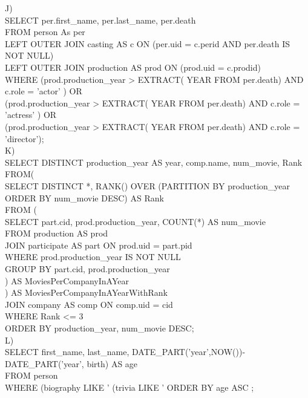 \documentclass{article}
\begin{document}
J)\\
SELECT per.first_name, per.last_name, per.death \\
FROM person As per\\
LEFT OUTER JOIN casting AS c ON (per.uid = c.perid AND per.death IS NOT NULL)\\
LEFT OUTER JOIN production AS prod ON (prod.uid = c.prodid)\\
WHERE (prod.production_year > EXTRACT( YEAR FROM per.death) AND c.role = 'actor' ) OR\\
	(prod.production_year > EXTRACT( YEAR FROM per.death) AND c.role = 'actress' ) OR\\
(prod.production_year > EXTRACT( YEAR FROM per.death) AND c.role = 'director');\\

K)\\
SELECT DISTINCT production_year AS year, comp.name, num_movie, Rank\\
FROM(\\
    SELECT DISTINCT *, RANK() OVER (PARTITION BY production_year ORDER BY num_movie DESC) AS Rank\\
    FROM (\\
        SELECT part.cid, prod.production_year, COUNT(*) AS num_movie\\
        FROM production AS prod\\
        JOIN participate AS part ON prod.uid = part.pid\\
        WHERE prod.production_year IS NOT NULL\\
        GROUP BY part.cid, prod.production_year\\
    ) AS MoviesPerCompanyInAYear\\
) AS MoviesPerCompanyInAYearWithRank\\
JOIN company AS comp ON comp.uid = cid\\
WHERE Rank <= 3\\
ORDER BY production_year, num_movie DESC;\\

L)\\
SELECT first_name, last_name, DATE_PART('year',NOW())-DATE_PART('year', birth) AS age\\
FROM person\\
WHERE (biography LIKE '%
(trivia LIKE '%
ORDER BY age ASC ;\\
\end{document}
